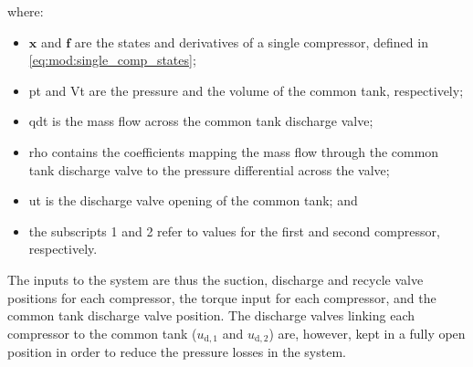 where:

\begin{itemize}
  \item $\bm{x}$ and $\bm{f}$ are the states and derivatives of a single compressor, defined in \eqref{eq:mod:single_comp_states};
  \item \gls{pt} and \gls{Vt} are the pressure and the volume of the common tank, respectively;
  \item \gls{qdt} is the mass flow across the common tank discharge valve;
  \item \gls{rho} contains the coefficients mapping the mass flow through the common tank discharge valve to the pressure differential across the valve;
  \item \gls{ut} is the discharge valve opening of the common tank; and
  \item the subscripts 1 and 2 refer to values for the first and second compressor, respectively.
\end{itemize}

The inputs to the system are thus the suction, discharge and recycle valve positions for each compressor, the torque input for each compressor, and the common tank discharge valve position.
The discharge valves linking each compressor to the common tank ($u_{\text{d},1}$ and $u_{\text{d},2}$) are, however, kept in a fully open position in order to reduce the pressure losses in the system.

